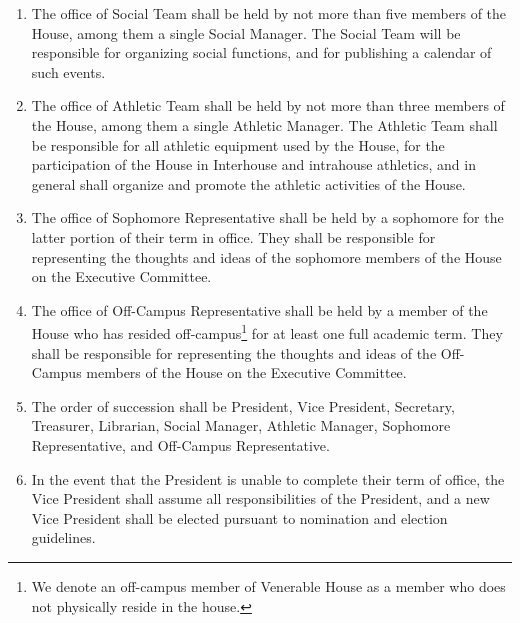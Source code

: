 \documentclass[10pt]{article} %
\begin{document}
\begin{enumerate}
\item The office of Social Team shall be held by not more than five members of the House, among them a single Social Manager. The Social Team will be responsible for organizing social functions, and for publishing a calendar of such events.
\item The office of Athletic Team shall be held by not more than three members of the House, among them a single Athletic Manager. The Athletic Team shall be responsible for all athletic equipment used by the House, for the participation of the House in Interhouse and intrahouse athletics, and in general shall organize and promote the athletic activities of the House.
\item The office of Sophomore Representative shall be held by a sophomore for the latter portion of their term in office. They shall be responsible for representing the thoughts and ideas of the sophomore members of the House on the Executive Committee.
\item The office of Off-Campus Representative shall be held by a member of the House who has resided off-campus\footnote{We denote an off-campus member of Venerable House as a member who does not physically reside in the house.} for at least one full academic term. They shall be responsible for representing the thoughts and ideas of the Off-Campus members of the House on the Executive Committee.
\item The order of succession shall be President, Vice President, Secretary, Treasurer, Librarian, Social Manager, Athletic Manager, Sophomore Representative, and Off-Campus Representative.
\item \label{PrezSuccession} In the event that the President is unable to complete their term of office, the Vice President shall assume all responsibilities of the President, and a new Vice President shall be elected pursuant to nomination and election guidelines.
\end{enumerate}
\end{document}
